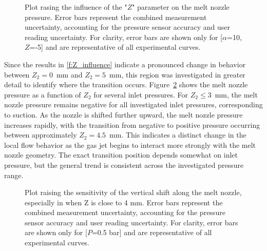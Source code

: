 \documentclass[../../main.tex]{subfiles}
\begin{document}
\vspace{0mm}
\begin{figure}[H]
    \centering
        
        \caption[Plot rasing the influence of the "$Z$" parameter on the melt nozzle pressure.]{Plot rasing the influence of the "$Z$" parameter on the melt nozzle pressure. Error bars represent the combined measurement uncertainty, accounting for the pressure sensor accuracy and user reading uncertainty. For clarity, error bars are shown only for [$\alpha$=10, $Z$=-5] and are representative of all experimental curves.}
        \label{f:Z_influence}
\end{figure}
\FloatBarrier
\vspace{0mm}




Since the results in \autoref{f:Z_influence} indicate a pronounced change in behavior between \(Z_2=0\)~mm and \(Z_2=5\)~mm, this region was investigated in greater detail to identify where the transition occurs. Figure~\ref{f:Z_influence_investigation} shows the melt nozzle pressure as a function of \(Z_2\) for several inlet pressures. For \(Z_2 \leq 3\)~mm, the melt nozzle pressure remains negative for all investigated inlet pressures, corresponding to suction. As the nozzle is shifted further upward, the melt nozzle pressure increases rapidly, with the transition from negative to positive pressure occurring between approximately \(Z_2=4.5\)~mm. This indicates a distinct change in the local flow behavior as the gas jet begins to interact more strongly with the melt nozzle geometry. The exact transition position depends somewhat on inlet pressure, but the general trend is consistent across the investigated pressure range.

\vspace{0mm}
\begin{figure}[H]
    \centering
        
        \caption[Plot raising the sensitivity of the vertical shift along the melt nozzle, especially in when Z is close to 4 mm.]{Plot raising the sensitivity of the vertical shift along the melt nozzle, especially in when Z is close to 4 mm. Error bars represent the combined measurement uncertainty, accounting for the pressure sensor accuracy and user reading uncertainty. For clarity, error bars are shown only for [$P$=0.5 bar] and are representative of all experimental curves.}
        \label{f:Z_influence_investigation}
\end{figure}
\FloatBarrier
\vspace{0mm}
\end{document}
